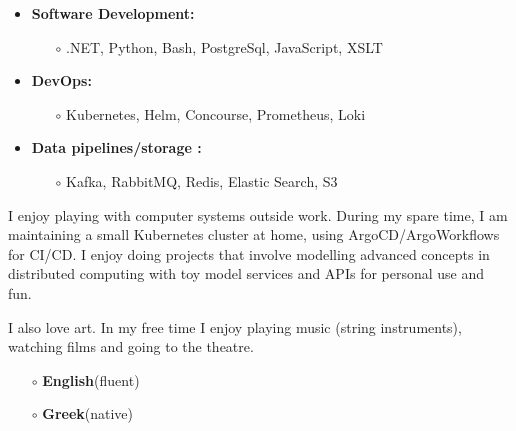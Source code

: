 \documentclass[11pt,a4paper]{altacv}
\begin{document}
\begin{itemize}
    \item {\bf Software Development:} 
    \smallskip
    \begin{itemize}
        \item[$\circ$] .NET, Python, Bash, PostgreSql, JavaScript, XSLT
    \end{itemize}
    \smallskip
    \item {\bf DevOps:} 
    \smallskip
    \begin{itemize}
        \item[$\circ$] Kubernetes, Helm, Concourse, Prometheus, Loki
    \end{itemize}
    \smallskip
    \item {\bf Data pipelines/storage :} 
    \smallskip
    \begin{itemize}
        \item[$\circ$] Kafka, RabbitMQ, Redis, Elastic Search, S3 
    \end{itemize}
    
\end{itemize}


\medskip


\justifying I enjoy playing with computer systems outside work. During my spare time, I am maintaining a small Kubernetes cluster at home, using ArgoCD/ArgoWorkflows for CI/CD. I enjoy doing projects that involve modelling advanced concepts in distributed computing with toy model services and APIs for personal use and fun.

\smallskip
I also love art. In my free time I enjoy playing music (string instruments), watching films and going to the theatre. 



\medskip
{}
\begin{itemize}
    \item[$\circ$]  \textbf{\textcolor{emphasis}{English}}\hfill (fluent)
    \item[$\circ$]  \textbf{\textcolor{emphasis}{Greek}}\hfill (native) 
\end{itemize}
\medskip
\end{document}
